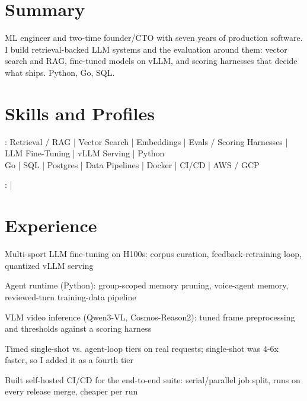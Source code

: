 \documentclass[print]{jack-resume}
\begin{document}
\pagecolor{darkmodeBackground}


\begin{minipage}[t][1cm][t]{.03\textwidth}
    \hfill
\end{minipage}

\section{Summary}
ML engineer and two-time founder/CTO with seven years of production software. I build retrieval-backed LLM systems and the evaluation around them: vector search and RAG, fine-tuned models on vLLM, and scoring harnesses that decide what ships. Python, Go, SQL.
\sectionsep

\section{Skills and Profiles}
:
Retrieval / RAG \hfill | \hfill
Vector Search \hfill | \hfill
Embeddings \hfill | \hfill
Evals / Scoring Harnesses \hfill | \hfill
LLM Fine-Tuning \hfill | \hfill
vLLM Serving \hfill | \hfill
Python \\
\hspace{1.0cm} Go \hfill | \hfill
SQL \hfill | \hfill
Postgres \hfill | \hfill
Data Pipelines \hfill | \hfill
Docker \hfill | \hfill
CI/CD \hfill | \hfill
AWS / GCP \\

\raggedright{
    :
      \href{https://www.linkedin.com/in/jack-sturtevant/}{ \ExternalLink} |
     \href{https://github.com/jacksturt}{ \ExternalLink}}

\section{Experience}

\begin{tightemize}
    \item Multi-sport LLM fine-tuning on H100s: corpus curation, feedback-retraining loop, quantized vLLM serving
    \item Agent runtime (Python): group-scoped memory pruning, voice-agent memory, reviewed-turn training-data pipeline
    \item VLM video inference (Qwen3-VL, Cosmos-Reason2): tuned frame preprocessing and thresholds against a scoring harness
    \item Timed single-shot vs. agent-loop tiers on real requests; single-shot was 4-6x faster, so I added it as a fourth tier
    \item Built self-hosted CI/CD for the end-to-end suite: serial/parallel job split, runs on every release merge, cheaper per run
\end{tightemize}
\sectionsep
\end{document}
